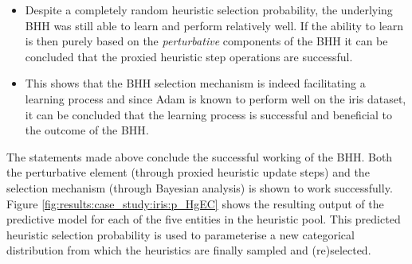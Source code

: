 \begin{itemize}
	\item Despite a completely random heuristic selection probability, the underlying \Acs{BHH} was still able to learn and perform relatively well. If the ability to learn is then purely based on the \textit{perturbative} components of the \Acs{BHH} it can be concluded that the proxied heuristic step operations are successful.

	\item This shows that the \Acs{BHH} selection mechanism is indeed facilitating a learning process and since \Acs{Adam} is known to perform well on the iris dataset, it can be concluded that the learning process is successful and beneficial to the outcome of the \Acs{BHH}.
\end{itemize}

The statements made above conclude the successful working of the \Acs{BHH}. Both the perturbative element (through proxied heuristic update steps) and the selection mechanism (through Bayesian analysis) is shown to work successfully. Figure \ref{fig:results:case_study:iris:p_HgEC} shows the resulting output of the predictive model for each of the five entities in the heuristic pool. This predicted heuristic selection probability is used to parameterise a new categorical distribution from which the heuristics are finally sampled and (re)selected.

